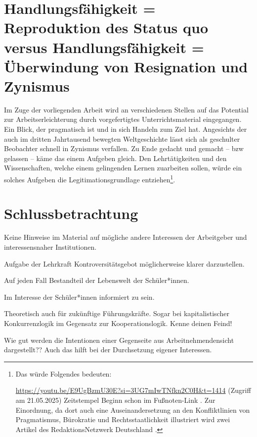 \section{Handlungsfähigkeit = Reproduktion des Status quo versus Handlungsfähigkeit = Überwindung von Resignation und Zynismus}
Im Zuge der vorliegenden Arbeit wird an verschiedenen Stellen auf das Potential zur Arbeitserleichterung durch vorgefertigtes Unterrichtsmaterial eingegangen. Ein Blick, der pragmatisch ist und in sich Handeln zum Ziel hat. Angesichts der auch im dritten Jahrtausend bewegten Weltgeschichte lässt sich als geschulter Beobachter schnell in Zynismus verfallen. Zu Ende gedacht und gemacht -- \gls{bzw} gelassen -- käme das einem Aufgeben gleich. Den Lehrtätigkeiten und den Wissenschaften, welche einem gelingenden Lernen zuarbeiten sollen, würde ein solches Aufgeben die Legitimationsgrundlage entziehen\footnote{
    Das würde Folgendes bedeuten: 

    \url{https://youtu.be/E9UgBzmU30E?si=3UG7mIwTNfkn2C0H&t=1414} (Zugriff am 21.05.2025) Zeitstempel Beginn schon im Fußnoten-Link \autocite[][Als Meme von $23^{\prime}34^{\prime\prime}$ bis $23^{\prime}50^{\prime\prime}$ schauen]{Wolle}. Zur Einordnung, da dort auch %
    eine Auseinandersetzung an den Konfliktlinien von Pragmatismus, Bürokratie und Rechtsstaatlichkeit illustriert wird zwei Artikel des RedaktionsNetzwerk Deutschland \autocites{Schwarzer.05.02.2021}{Schwarzer.08.02.2021}.
    }. 


\autocite[]{Roler2016}

\section{Schlussbetrachtung}
Keine Hinweise im Material auf mögliche andere Interessen der Arbeitgeber und interessensnaher Institutionen.

Aufgabe der Lehrkraft Kontroversitätsgebot möglicherweise klarer darzustellen.

Auf jeden Fall Bestandteil der Lebenswelt der Schüler*innen.

Im Interesse der Schüler*innen informiert zu sein.

Theoretisch auch für zukünftige Führungskräfte. Sogar bei kapitalistischer Konkurrenzlogik im Gegensatz zur Kooperationslogik. Kenne deinen Feind!

Wie gut werden die Intentionen einer Gegenseite aus Arbeitnehmendensicht dargestellt??
Auch das hilft bei der Durchsetzung eigener Interessen.

